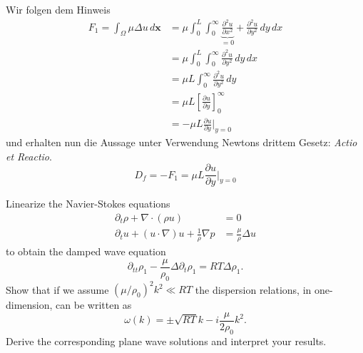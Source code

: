 \documentclass[12pt]{exam}
\newcommand{\del}{\partial}
\begin{document}
\begin{questions}
    \begin{solution} Wir folgen dem Hinweis
        \begin{align*}
            F_1 = \int_{\Omega} \mu \Delta u \, d \mathbf{x} &= \mu \int_0^L \int_0^{\infty} \underbrace{\frac{\del^2 u}{\del x^2}}_{= 0} + \frac{\del^2 u}{\del y^2} \, dy \, dx \\
            &= \mu \int_0^L \int_0^{\infty} \frac{\del^2 u}{\del y^2} \, dy \, dx \\
            &= \mu L \int_0^{\infty} \frac{\del^2 u}{\del y^2} \, dy \\
            &= \mu L \left[ \frac{\del u}{\del y} \right]_{0}^{\infty} \\
            &= -\mu L \frac{\del u}{\del y} \bigg \vert_{y = 0}
        \end{align*}
        und erhalten nun die Aussage unter Verwendung Newtons drittem Gesetz: \textit{Actio et Reactio}.
        \begin{equation*}
            D_f = -F_1 = \mu L \frac{\del u}{\del y} \bigg \vert_{y = 0}
        \end{equation*}
    \end{solution}
    
    
    \question Linearize the Navier-Stokes equations
    \begin{align*}
        \del_t \rho + \nabla \cdot (\rho u) &= 0 \\
        \del_t u + (u \cdot \nabla) u + \frac{1}{\rho} \nabla p &= \frac{\mu}{\rho} \Delta u
    \end{align*}
    to obtain the damped wave equation
    \begin{equation*}
        \del_{tt} \rho_1 - \frac{\mu}{\rho_0} \Delta \del_t \rho_1 = RT \Delta \rho_1.
    \end{equation*}
    Show that if we assume $(\mu / \rho_0)^2 k^2 \ll RT$ the dispersion relations, in one-dimension, can be written as
    \begin{equation*}
        \omega(k) = \pm \sqrt{RT}k - i \frac{\mu}{2 \rho_0} k^2.
    \end{equation*}
    Derive the corresponding plane wave solutions and interpret your results.
    

\end{questions}
\end{document}
